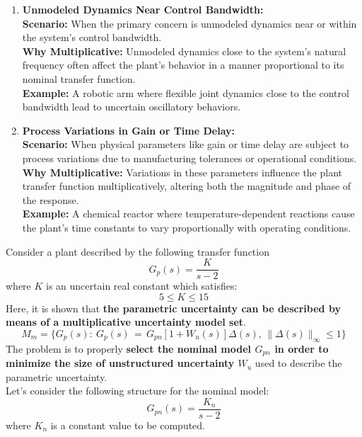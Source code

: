 \begin{enumerate}
    \item \textbf{Unmodeled Dynamics Near Control Bandwidth:}\\
    \textbf{Scenario:} When the primary concern is unmodeled dynamics near or within the system’s control bandwidth.\\
    \textbf{Why Multiplicative:} Unmodeled dynamics close to the system's natural frequency often affect the plant’s behavior in a manner proportional to its nominal transfer function.\\
    \textbf{Example:} A robotic arm where flexible joint dynamics close to the control bandwidth lead to uncertain oscillatory behaviors.

    \item \textbf{Process Variations in Gain or Time Delay:}\\
    \textbf{Scenario:} When physical parameters like gain or time delay are subject to process variations due to manufacturing tolerances or operational conditions.\\
    \textbf{Why Multiplicative:} Variations in these parameters influence the plant transfer function multiplicatively, altering both the magnitude and phase of the response.\\
    \textbf{Example:} A chemical reactor where temperature-dependent reactions cause the plant's time constants to vary proportionally with operating conditions.
\end{enumerate}

\begin{example}
Consider a plant described by the following transfer function
\[
G_p(s) = \frac{K}{s-2}
\]
where $K$ is an uncertain real constant which satisfies:
\[
5 \leq K \leq 15
\]
Here, it is shown that \textbf{the parametric uncertainty can be described by means of a multiplicative uncertainty model set}.
\[
M_m = \{G_p(s):\:G_p(s)\,=\,G_{pn}[1 + W_u(s)]\Delta(s),\,\|\Delta(s)\|_\infty\leq 1 \}
\]
The problem is to properly \textbf{select the nominal model $G_{pn}$ in order to minimize the size of unstructured uncertainty $W_u$} used to describe the parametric uncertainty.\\
Let's consider the following structure for the nominal model:
\[
G_{pn}(s)=\frac{K_n}{s-2}
\]
where $K_n$ is a constant value to be computed.

\end{example}

